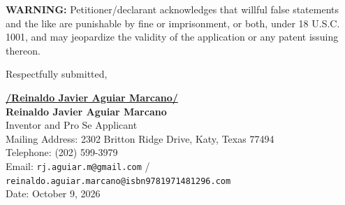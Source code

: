 \documentclass[11pt,letterpaper]{article}
\begin{document}
\vspace{0.4cm}
\textbf{WARNING:} Petitioner/declarant acknowledges that willful false statements and the like are punishable by fine or imprisonment, or both, under 18 U.S.C. 1001, and may jeopardize the validity of the application or any patent issuing thereon.

\vspace{0.8cm}
\begin{singlespace}
\noindent Respectfully submitted, \par\vspace{1.2cm}
\underline{\textbf{/Reinaldo Javier Aguiar Marcano/}} \\
\textbf{Reinaldo Javier Aguiar Marcano} \\
Inventor and Pro Se Applicant \\
Mailing Address: 2302 Britton Ridge Drive, Katy, Texas 77494 \\
Telephone: (202) 599-3979 \\
Email: \texttt{rj.aguiar.m@gmail.com} / \texttt{reinaldo.aguiar.marcano@isbn9781971481296.com} \\
Date: October 9, 2026
\end{singlespace}
\end{document}
